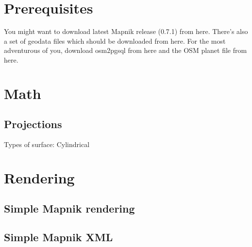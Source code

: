 \documentclass{article}
\begin{document}
\section{Prerequisites}

You might want to download latest Mapnik release (0.7.1) from here.
There's also a set of geodata files which should be downloaded from here.
For the most adventurous of you, download osm2pgsql from here and the OSM planet file from here.

\section{Math}

\subsection{Projections}

Types of surface:
Cylindrical

\section{Rendering}

\subsection{Simple Mapnik rendering}



\subsection{Simple Mapnik XML}
\end{document}
